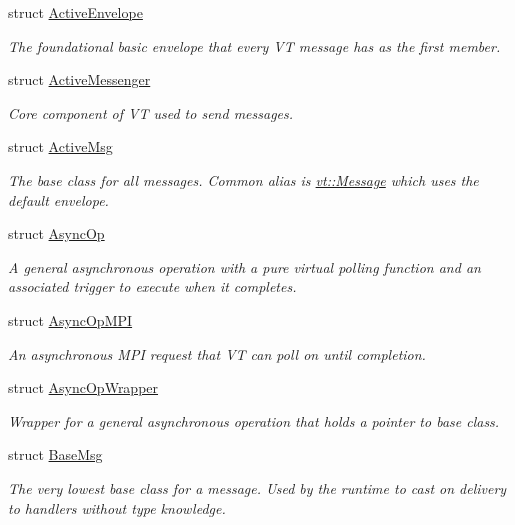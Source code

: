\begin{DoxyCompactItemize}
\item 
struct \hyperlink{structvt_1_1messaging_1_1_active_envelope}{Active\+Envelope}
\begin{DoxyCompactList}\small\item\em The foundational basic envelope that every VT message has as the first member. \end{DoxyCompactList}\item 
struct \hyperlink{structvt_1_1messaging_1_1_active_messenger}{Active\+Messenger}
\begin{DoxyCompactList}\small\item\em Core component of VT used to send messages. \end{DoxyCompactList}\item 
struct \hyperlink{structvt_1_1messaging_1_1_active_msg}{Active\+Msg}
\begin{DoxyCompactList}\small\item\em The base class for all messages. Common alias is {\ttfamily \hyperlink{namespacevt_a3a3ddfef40b4c90915fa43cdd5f129ea}{vt\+::\+Message}} which uses the default envelope. \end{DoxyCompactList}\item 
struct \hyperlink{structvt_1_1messaging_1_1_async_op}{Async\+Op}
\begin{DoxyCompactList}\small\item\em A general asynchronous operation with a pure virtual polling function and an associated trigger to execute when it completes. \end{DoxyCompactList}\item 
struct \hyperlink{structvt_1_1messaging_1_1_async_op_m_p_i}{Async\+Op\+M\+PI}
\begin{DoxyCompactList}\small\item\em An asynchronous M\+PI request that VT can poll on until completion. \end{DoxyCompactList}\item 
struct \hyperlink{structvt_1_1messaging_1_1_async_op_wrapper}{Async\+Op\+Wrapper}
\begin{DoxyCompactList}\small\item\em Wrapper for a general asynchronous operation that holds a pointer to base class. \end{DoxyCompactList}\item 
struct \hyperlink{structvt_1_1messaging_1_1_base_msg}{Base\+Msg}
\begin{DoxyCompactList}\small\item\em The very lowest base class for a message. Used by the runtime to cast on delivery to handlers without type knowledge. \end{DoxyCompactList}\item 

\end{DoxyCompactItemize}
